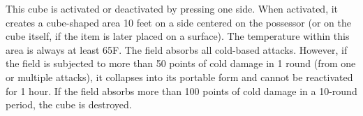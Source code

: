 {\begin{comment}
Cube Face & Charge Cost per Minute & Maximum Speed & Effect \\
1 & 1 & 30 ft. & Keeps out gases, wind, etc. \\
2 & 2 & 20 ft. & Keeps out nonliving matter \\
3 & 3 & 15 ft. & Keeps out living matter \\
4 & 4 & 10 ft. & Keeps out magic \\
5 & 6 & 10 ft. & Keeps out all things \\
6 & 0 & As normal & Deactivates &

Attack Form & Extra Charges \\
Horn of blasting & 6 \\
Wall of fire & 2 \\
Passwall & 3 \\
Disintegrate & 6 \\
Phase door & 5 \\
Prismatic spray & 7 &

Moderate evocation; CL 10th; Craft Wondrous Item, wall of force; Price 62,000 gp.
\end{comment}

 This cube is activated or deactivated by pressing one side. When activated, it creates a cube-shaped area 10 feet on a side centered on the possessor (or on the cube itself, if the item is later placed on a surface). The temperature within this area is always at least 65\degree F. The field absorbs all cold-based attacks. However, if the field is subjected to more than 50 points of cold damage in 1 round (from one or multiple attacks), it collapses into its portable form and cannot be reactivated for 1 hour. If the field absorbs more than 100 points of cold damage in a 10-round period, the cube is destroyed.


\begin{comment}
Cubic Gate:} This item is fashioned from carnelian. Each of the six sides of the cube is keyed to a plane, one of which is the Material Plane. The character creating the item should choose the planes to which the other five sides are keyed.

If a side of the cubic gate is pressed once, it opens a gate to a random point on the plane keyed to that side. There is a 10\% chance per minute that an outsider from that plane (determine randomly) comes through it looking for food, fun, or trouble. Pressing the side a second time closes the gate. It is impossible to open more than one gate at a time.


\end{comment}}

